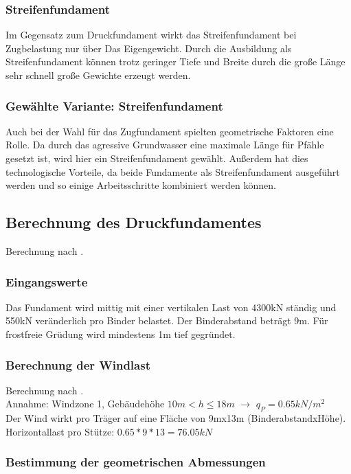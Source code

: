 \documentclass[11pt,fleqn,a4paper,halfparskip]{article}
\begin{document}
\subsubsection*{Streifenfundament}
Im Gegensatz zum Druckfundament wirkt das Streifenfundament bei Zugbelastung nur über Das Eigengewicht. Durch die Ausbildung als Streifenfundament können trotz geringer Tiefe und Breite durch die große Länge sehr schnell große Gewichte erzeugt werden.
\subsubsection*{Gewählte Variante: Streifenfundament}
Auch bei der Wahl für das Zugfundament spielten geometrische Faktoren eine Rolle. Da durch das agressive Grundwasser eine maximale Länge für Pfähle gesetzt ist, wird hier ein Streifenfundament gewählt. Außerdem hat dies technologische Vorteile, da beide Fundamente als Streifenfundament ausgeführt werden und so einige Arbeitsschritte kombiniert werden können.
\subsection{Berechnung des Druckfundamentes}
Berechnung nach \cite[S.107ff]{wsp}.
\subsubsection{Eingangswerte}
Das Fundament wird mittig mit einer vertikalen Last von 4300kN ständig und 550kN veränderlich pro Binder belastet. Der Binderabstand beträgt 9m. Für frostfreie Grüdung wird mindestens 1m tief gegründet.
\subsubsection*{Berechnung der Windlast}
Berechnung nach \cite[3.25]{schneider}.\\
Annahme: Windzone 1, Gebäudehöhe $10m < h \le 18m$ $\rightarrow$ $q_P = 0.65kN/m^2$\\
Der Wind wirkt pro Träger auf eine Fläche von 9mx13m (BinderabstandxHöhe).\\
Horizontallast pro Stütze: $0.65*9*13 = 76.05kN$


\subsubsection{Bestimmung der geometrischen Abmessungen}
\end{document}
